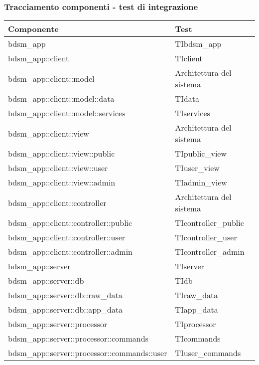 		\subsubsection{Tracciamento componenti - test di integrazione}
			\begin{center}
			\def\arraystretch{1.5}
			\bgroup
			\begin{longtable}{| p{6cm} | p{4cm} |}
					\hline
					\textbf{Componente} & \textbf{Test}\\
					\hline
					bdsm\_app & TIbdsm\_app\\
					\hline
					bdsm\_app::\-client & TIclient\\
					\hline
					bdsm\_app::\-client::\-model & Architettura del sistema\\
					\hline
					bdsm\_app::\-client::\-model::\-data & TIdata\\
					\hline
					bdsm\_app::\-client::\-model::\-services & TIservices\\
					\hline
					bdsm\_app::\-client::\-view & Architettura del sistema\\
					\hline
					bdsm\_app::\-client::\-view::\-public & TIpublic\_view\\
					\hline
					bdsm\_app::\-client::\-view::\-user & TIuser\_view\\
					\hline
					bdsm\_app::\-client::\-view::\-admin & TIadmin\_view\\
					\hline
					bdsm\_app::\-client::\-controller & Architettura del sistema\\
					\hline
					bdsm\_app::\-client::\-controller::\-public & TIcontroller\_public\\
					\hline
					bdsm\_app::\-client::\-controller::\-user & TIcontroller\_user\\
					\hline
					bdsm\_app::\-client::\-controller::\-admin & TIcontroller\_admin\\
					\hline
					bdsm\_app::\-server & TIserver\\
					\hline
					bdsm\_app::\-server::\-db & TIdb\\
					\hline
					bdsm\_app::\-server::\-db::\-raw\_data & TIraw\_data\\
					\hline
					bdsm\_app::\-server::\-db::\-app\_data & TIapp\_data\\
					\hline
					bdsm\_app::\-server::\-processor & TIprocessor\\
					\hline
					bdsm\_app::\-server::\-processor::\-commands & TIcommands\\
					\hline
					bdsm\_app::\-server::\-processor::\-commands::\-user & TIuser\_commands\\

\end{longtable}
\end{center}
